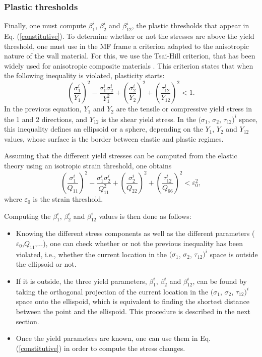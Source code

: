 \documentclass[]{article}
\begin{document}
\subsubsection{Plastic thresholds}
Finally, one must compute $\beta_1^i$, $\beta_2^i$ and $\beta_{12}^i$, the plastic thresholds that appear in Eq. (\ref{constitutive}).
To determine whether or not the stresses are above the yield threshold, one must use in the MF frame a criterion adapted to the anisotropic nature of the wall material. For this, we use the Tsai-Hill criterion, that has been widely used for anisotropic composite materials \citep{tsai65, fuc06, mor15}. This criterion states that when the following inequality is violated, plasticity starts:
\begin{equation}\label{tsai_hill}
	\left(\frac{\sigma_1^i}{Y_1}\right)^2 - \frac{\sigma_1^i \sigma_2^i}{Y_1^2} + \left(\frac{\sigma_2^i}{Y_2}\right)^2 + \left(\frac{\tau_{12}^i}{Y_{12}}\right)^2 <1.
\end{equation}
In the previous equation, $Y_1$ and $Y_2$ are the tensile or compressive yield stress in the 1 and 2 directions, and $Y_{12}$ is the shear yield stress. In the $(\sigma_1$, $\sigma_2$, $\tau_{12})^i$ space, this inequality defines an ellipsoid or a sphere, depending on the $Y_1$, $Y_2$ and $Y_{12}$ values, whose surface is the border between elastic and plastic regimes. 

Assuming that the different yield stresses can be computed from the elastic theory using an isotropic strain threshold, one obtains
\begin{equation}
	\left(\frac{\sigma_1^i}{Q_{11}}\right)^2 - \frac{\sigma_1^i \sigma_2^i}{Q_{11}^2} + \left(\frac{\sigma_2^i}{Q_{22}}\right)^2 + \left(\frac{\tau_{12}^i}{Q_{66}}\right)^2 <\varepsilon_0^2,
\end{equation}
where $\varepsilon_0$ is the strain threshold. 

Computing the $\beta_1^i$, $\beta_2^i$ and $\beta_{12}^i$ values is then done as follows:
\begin{itemize}
	\item Knowing the different stress components as well as the different parameters ($\varepsilon_0$,$Q_{11}$,...), one can check whether or not the previous inequality has been violated, i.e., whether the current location in the $(\sigma_1$, $\sigma_2$, $\tau_{12})^i$ space is outside the ellipsoid or not.
	\item If it is outside, the three yield parameters, $\beta_1^i$, $\beta_2^i$ and $\beta_{12}^i$, can be found by taking the orthogonal  projection of the current location in the $(\sigma_1$, $\sigma_2$, $\tau_{12})^i$ space onto the ellispoid, which is equivalent to finding the shortest distance between the point and the ellispoid. This procedure is described in the next section.
	\item Once the yield parameters are known, one can use them in Eq. (\ref{constitutive}) in order to compute the stress changes.
\end{itemize} 
\end{document}
